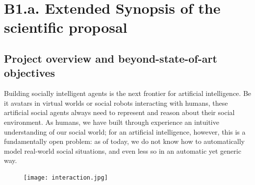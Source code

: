 
\newrefsection


\chapter{B1.a. Extended Synopsis of the scientific proposal}\label{part1}




\section{Project overview and beyond-state-of-art objectives}

Building socially intelligent agents is the next frontier for artificial
intelligence. Be it avatars in virtual worlds or social robots interacting with humans,
these artificial social agents always need to represent and reason about their
social environment. As humans, we have built through experience an intuitive
understanding of our social world; for an artificial intelligence, however, this
is a fundamentally open problem: as of today, we do not know how to automatically
model real-world social situations, and even less so in an automatic yet generic way.

\begin{figure}
    \centering
    \vspace{-10pt}
    \texttt{[image: interaction.jpg]}
    \label{fig:interaction}
\end{figure}

